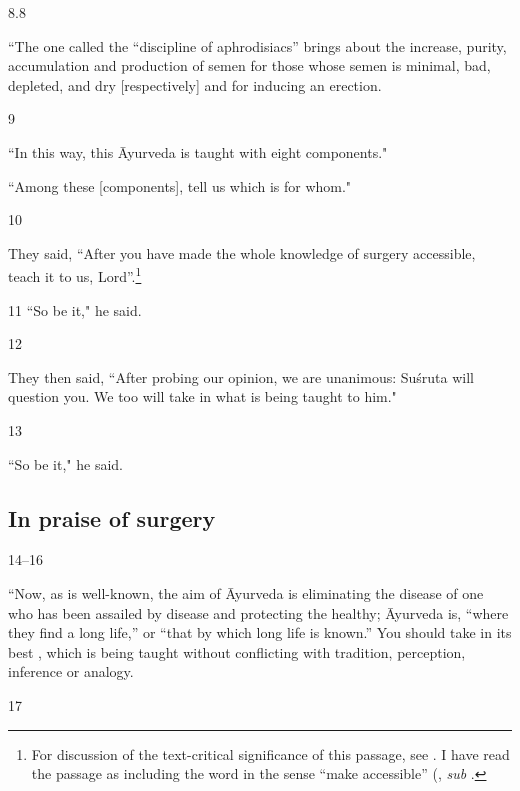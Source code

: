 \begin{translation}
    
    \item[8.8] 
    
“The one called the “discipline of aphrodisiacs”
brings about the increase, purity, accumulation and  production
of semen for those whose semen is minimal, bad, depleted, and dry
[respectively] and for inducing an erection.
    
    \item[9] 
    
“In this way, this Āyurveda is taught with eight components."
    
“Among these [components], tell us which is for whom."
    
    \item[10] 
    
They said,  “After you have made the
whole knowledge of surgery accessible, teach it to us,
Lord”.\footnote{For discussion of the text-critical significance of
    this passage, see \cite{hari-2013}. I have read the passage as
    including the word  in the sense “make accessible”
    (\cite[cf.][94]{moni-sans}, \emph{sub} .}
    
    \item[11]  “So be it," he said.
    
    \item[12] 
    
They then said,  “After probing our opinion, we are unanimous: Suśruta
will question you. We too will take in what is being taught to him."
    
 \item[13] 
 
“So be it," he said.

\subsection{In praise of surgery}    
    \item[14--16] 

“Now, as is well-known, the aim of Āyurveda is eliminating the
disease of one who has been assailed by disease and protecting the
healthy; Āyurveda is, “where they find a long life,” or “that by
which long life is known.” You should take in its best
, which is being taught without conflicting with
tradition, perception, inference or analogy.
    
    \item[17] 
    

\end{translation}
